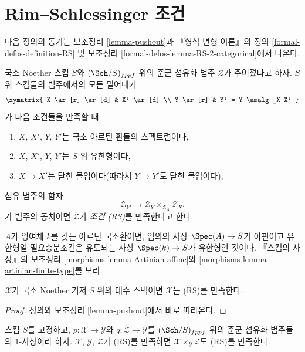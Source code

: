\section{Rim--Schlessinger 조건}
\label{section-RS}

\noindent
다음 정의의 동기는 보조정리 \ref{lemma-pushout}과 『형식 변형 이론』의
정의 \ref{formal-defos-definition-RS} 및 보조정리
\ref{formal-defos-lemma-RS-2-categorical}에서 나온다.

\begin{definition}
\label{definition-RS}
국소 Noether 스킴 $S$와 $(\Sch/S)_{fppf}$ 위의 준군 섬유화 범주
$\mathcal{Z}$가 주어졌다고 하자. $S$ 위 스킴들의 범주에서의 모든 밀어내기
$$
\xymatrix{
X \ar[r] \ar[d] & X' \ar[d] \\
Y \ar[r] & Y' = Y \amalg_X X'
}
$$
가 다음 조건들을 만족할 때
\begin{enumerate}
\item $X$, $X'$, $Y$, $Y'$는 국소 아르틴 환들의 스펙트럼이다,
\item $X$, $X'$, $Y$, $Y'$는 $S$ 위 유한형이다,
\item $X \to X'$는 닫힌 몰입이다(따라서 $Y \to Y'$도 닫힌 몰입이다),
\end{enumerate}
섬유 범주의 함자
$$
\mathcal{Z}_{Y'}
\longrightarrow
\mathcal{Z}_Y \times_{\mathcal{Z}_X} \mathcal{Z}_{X'}
$$
가 범주의 동치이면 $\mathcal{Z}$가 {\it 조건 (RS)}를 만족한다고 한다.
\end{definition}

\noindent
$A$가 잉여체 $k$를 갖는 아르틴 국소환이면, 임의의 사상
$\Spec(A) \to S$가 아핀이고 유한형일 필요충분조건은 유도되는 사상
$\Spec(k) \to S$가 유한형인 것이다. 『스킴의 사상』의 보조정리
\ref{morphisms-lemma-Artinian-affine}와
\ref{morphisms-lemma-artinian-finite-type}를 보라.

\begin{lemma}
\label{lemma-algebraic-stack-RS}
$\mathcal{X}$가 국소 Noether 기저 $S$ 위의 대수 스택이면
$\mathcal{X}$는 (RS)를 만족한다.
\end{lemma}

\begin{proof}
정의와 보조정리 \ref{lemma-pushout}에서 바로 따라온다.
\end{proof}

\begin{lemma}
\label{lemma-fibre-product-RS}
스킴 $S$를 고정하고, $p : \mathcal{X} \to \mathcal{Y}$와
$q : \mathcal{Z} \to \mathcal{Y}$를 $(\Sch/S)_{fppf}$ 위의
준군 섬유화 범주들의 $1$-사상이라 하자. $\mathcal{X}$,
$\mathcal{Y}$, $\mathcal{Z}$가 (RS)를 만족하면
$\mathcal{X} \times_\mathcal{Y} \mathcal{Z}$도 (RS)를 만족한다.
\end{lemma}

